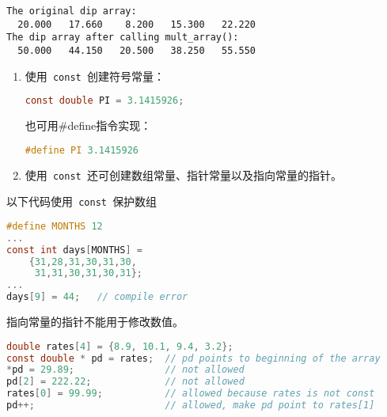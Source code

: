 \begin{frame}[fragile]
\begin{lstlisting}[backgroundcolor=\color{red!20}]
The original dip array:
  20.000   17.660    8.200   15.300   22.220 
The dip array after calling mult_array():
  50.000   44.150   20.500   38.250   55.550 
\end{lstlisting}  
\end{frame}

\begin{frame}[fragile]
\begin{enumerate}
\item 使用\lstinline| const |创建符号常量：
\begin{lstlisting}[language=c,backgroundcolor=\color{red!20}]
const double PI = 3.1415926; 
\end{lstlisting}
也可用{\tf \#define}指令实现：
\begin{lstlisting}[language=c,backgroundcolor=\color{red!20}]
#define PI 3.1415926
\end{lstlisting}
\end{enumerate}
\end{frame}

\begin{frame}[fragile]
\begin{enumerate}\setcounter{enumi}{1}
\item 使用\lstinline| const |还可创建数组常量、指针常量以及指向常量的指针。
\end{enumerate}
\end{frame}

\begin{frame}[fragile]
以下代码使用\lstinline| const |保护数组
\begin{lstlisting}[language=c,backgroundcolor=\color{red!20}]
#define MONTHS 12
...
const int days[MONTHS] = 
    {31,28,31,30,31,30,
     31,31,30,31,30,31}; 
...
days[9] = 44;   // compile error
\end{lstlisting}
\end{frame}

\begin{frame}[fragile]
指向常量的指针不能用于修改数值。
\begin{lstlisting}[language=c,backgroundcolor=\color{red!20}]
double rates[4] = {8.9, 10.1, 9.4, 3.2};
const double * pd = rates;  // pd points to beginning of the array
*pd = 29.89;                // not allowed
pd[2] = 222.22;             // not allowed
rates[0] = 99.99;           // allowed because rates is not const
pd++;                       // allowed, make pd point to rates[1]
\end{lstlisting} 
\end{frame}

